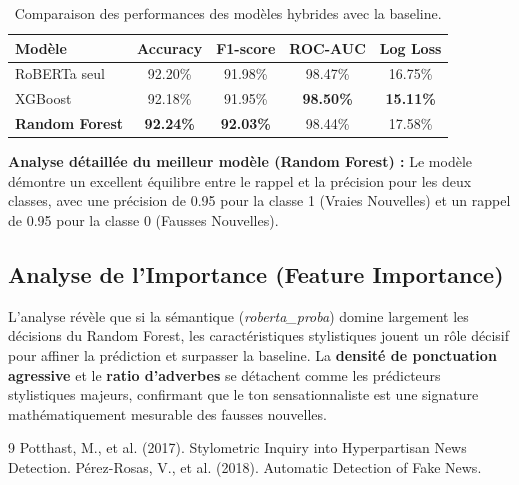 \documentclass[11pt,twocolumn]{article}
\begin{document}
\begin{table}[h]
\centering
\begin{small}
\begin{tabular}{lcccc}
\toprule
Modèle & Accuracy & F1-score & ROC-AUC & Log Loss \\
\midrule
RoBERTa seul & 92.20\% & 91.98\% & 98.47\% & 16.75\% \\
XGBoost & 92.18\% & 91.95\% & \textbf{98.50\%} & \textbf{15.11\%} \\
\textbf{Random Forest} & \textbf{92.24\%} & \textbf{92.03\%} & 98.44\% & 17.58\% \\
\bottomrule
\end{tabular}
\end{small}
\caption{Comparaison des performances des modèles hybrides avec la baseline.}
\end{table}

\textbf{Analyse détaillée du meilleur modèle (Random Forest) :}
Le modèle démontre un excellent équilibre entre le rappel et la précision pour les deux classes, avec une précision de 0.95 pour la classe 1 (Vraies Nouvelles) et un rappel de 0.95 pour la classe 0 (Fausses Nouvelles).

\subsection{Analyse de l'Importance (Feature Importance)}
L'analyse révèle que si la sémantique (\textit{roberta\_proba}) domine largement les décisions du Random Forest, les caractéristiques stylistiques jouent un rôle décisif pour affiner la prédiction et surpasser la baseline. La \textbf{densité de ponctuation agressive} et le \textbf{ratio d'adverbes} se détachent comme les prédicteurs stylistiques majeurs, confirmant que le ton sensationnaliste est une signature mathématiquement mesurable des fausses nouvelles.



\begin{thebibliography}{9}
 Potthast, M., et al. (2017). Stylometric Inquiry into Hyperpartisan News Detection.
 Pérez-Rosas, V., et al. (2018). Automatic Detection of Fake News.
\end{thebibliography}
\end{document}
